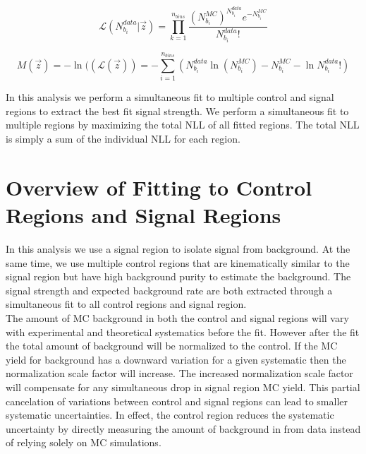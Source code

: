 \begin{equation}
\label{eqn:binnedlikelihood2}
{\mathcal{L}}(N^{data}_{b_i}|\vec{z}) = {\displaystyle\prod_{k=1}^{n_{bins}} \frac{(N^{MC}_{b_i})^{N^{data}_{b_i}}e^{-N^{MC}_{b_i}}}{N^{data}_{b_i}!}}
\end{equation}

\begin{equation}
\label{eqn:binnedNLL2}
M(\vec{z})=-\ln(({\mathcal{L}}(\vec{z})) = -{\displaystyle\sum_{i=1}^{n_{bins}}} ( N^{data}_{b_i} \ln( N^{MC}_{b_i} ) - N^{MC}_{b_i} - \ln{N^{data}_{b_i}!} )
\end{equation}

\indent In this analysis we perform a simultaneous fit to multiple control and signal regions to extract the best fit signal strength.  We perform a simultaneous fit to multiple regions by maximizing the total NLL of all fitted regions.  The total NLL is simply a sum of the individual NLL for each region.  \\

\section{Overview of Fitting to Control Regions and Signal Regions}
\label{sec:stat:Bkg}

\indent In this analysis we use a signal region to isolate signal from background.  At the same time, we use multiple control regions that are kinematically similar to the signal region but have high background purity to estimate the background.  The signal strength and expected background rate are both extracted through a simultaneous fit to all control regions and signal region.  \\


\indent The amount of MC background in both the control and signal regions will vary with experimental and theoretical systematics before the fit.  However after the fit the total amount of background will be normalized to the control.  If the MC yield for background has a downward variation for a given systematic then the normalization scale factor will increase.  The increased normalization scale factor will compensate for any simultaneous drop in signal region MC yield.  This partial cancelation of variations between control and signal regions can lead to smaller systematic uncertainties.  In effect, the control region reduces the systematic uncertainty by directly measuring the amount of background in from data instead of relying solely on MC simulations.  \\

